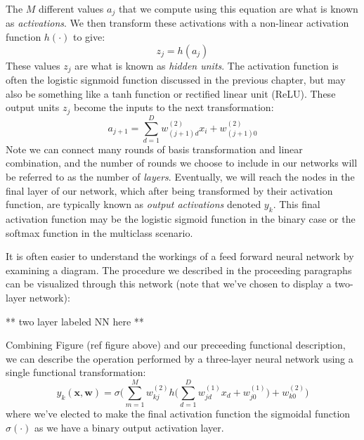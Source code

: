 The $M$ different values $a_{j}$ that we compute using this equation are what is known as \textit{activations}. We then transform these activations with a non-linear activation function $h(\cdot)$ to give:
\begin{equation} \label{basic-nn-z-outputs}
	z_{j} = h(a_{j})
\end{equation}
These values $z_{j}$ are what is known as \textit{hidden units}. The activation function is often the logistic signmoid function discussed in the previous chapter, but may also be something like a tanh function or rectified linear unit (ReLU). These output units $z_{j}$ become the inputs to the next transformation:
\begin{equation} \label{basic-nn-form-next-layer}
	a_{j+1} = \sum_{d=1}^{D} w_{(j+1)d}^{(2)} x_{i} + w_{(j+1)0}^{(2)}
\end{equation}
Note we can connect many rounds of basis transformation and linear combination, and the number of rounds we choose to include in our networks will be referred to as the number of \textit{layers}. Eventually, we will reach the nodes in the final layer of our network, which after being transformed by their activation function, are typically known as \textit{output activations} denoted $y_{k}$. This final activation function may be the logistic sigmoid function in the binary case or the softmax function in the multiclass scenario.

It is often easier to understand the workings of a feed forward neural network by examining a diagram. The procedure we described in the proceeding paragraphs can be visualized through this network (note that we've chosen to display a two-layer network):

** two layer labeled NN here **


Combining Figure (ref figure above) and our preceeding functional description, we can describe the operation performed by a three-layer neural network using a single functional transformation:
\begin{equation} \label{full-nn-equation}
	y_{k}(\textbf{x}, \textbf{w}) = \sigma\bigg(\sum_{m=1}^{M}w_{kj}^{(2)} h\bigg(\sum_{d=1}^{D}w_{jd}^{(1)}x_{d} + w_{j0}^{(1)}\bigg) + w_{k0}^{(2)}\bigg)
\end{equation}
where we've elected to make the final activation function the sigmoidal function $\sigma(\cdot)$ as we have a binary output activation layer.

